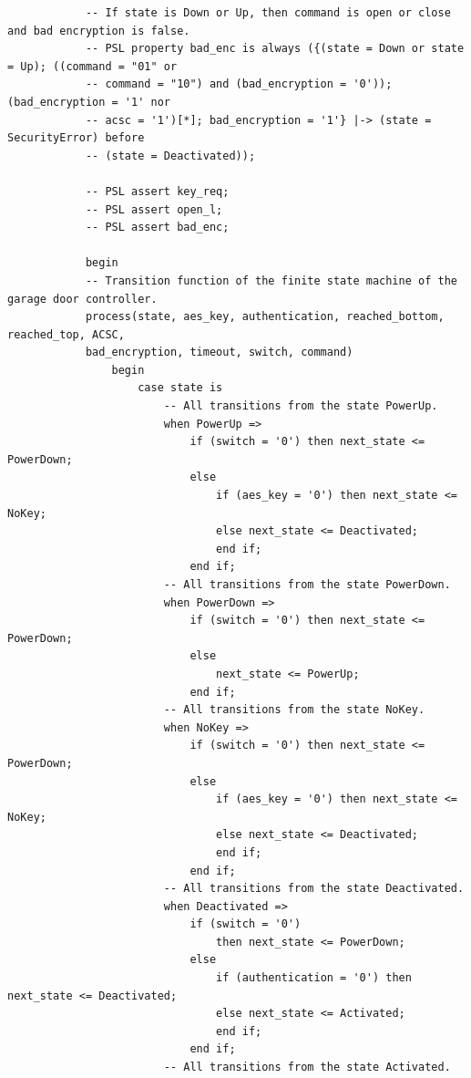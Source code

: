 \documentclass[a4paper,11pt]{article}
\begin{document}
\begin{verbatim}
            -- If state is Down or Up, then command is open or close and bad encryption is false.
            -- PSL property bad_enc is always ({(state = Down or state = Up); ((command = "01" or
            -- command = "10") and (bad_encryption = '0')); (bad_encryption = '1' nor
            -- acsc = '1')[*]; bad_encryption = '1'} |-> (state = SecurityError) before
            -- (state = Deactivated));

            -- PSL assert key_req;
            -- PSL assert open_l;
            -- PSL assert bad_enc;

            begin
            -- Transition function of the finite state machine of the garage door controller.
            process(state, aes_key, authentication, reached_bottom, reached_top, ACSC,
            bad_encryption, timeout, switch, command)
                begin
                    case state is
                        -- All transitions from the state PowerUp.
                        when PowerUp =>
                            if (switch = '0') then next_state <= PowerDown;
                            else
                                if (aes_key = '0') then next_state <= NoKey;
                                else next_state <= Deactivated;
	                            end if;
	                        end if;
                        -- All transitions from the state PowerDown.
                        when PowerDown =>
                            if (switch = '0') then next_state <= PowerDown;
                            else
                                next_state <= PowerUp;
	                        end if;
                        -- All transitions from the state NoKey.
                        when NoKey =>
                            if (switch = '0') then next_state <= PowerDown;
                            else
                                if (aes_key = '0') then next_state <= NoKey;
                                else next_state <= Deactivated;
	                            end if;
	                        end if;
                        -- All transitions from the state Deactivated.
                        when Deactivated =>
                            if (switch = '0')
                                then next_state <= PowerDown;
                            else
                                if (authentication = '0') then next_state <= Deactivated;
                                else next_state <= Activated;
	                            end if;
	                        end if;
                        -- All transitions from the state Activated.

\end{verbatim}
\end{document}
